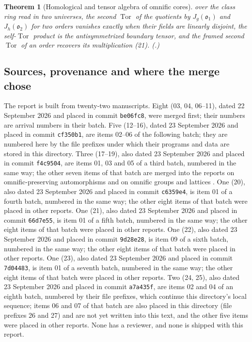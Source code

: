 \documentclass[11pt,letterpaper]{article}
\numberwithin{equation}{section}
\theoremstyle{definition}
\theoremstyle{remark}
\theoremstyle{plain}
\newtheorem{maintheorem}{Theorem}
\newcommand{\Tor}{\operatorname{Tor}}
\begin{document}
\begin{maintheorem}[Homological and tensor algebra of omnific cores]
over the class ring read in two universes, the second $\Tor$ of the quotients by $J_g(\mathfrak o_1)$ and $J_h(\mathfrak o_2)$ for two orders
vanishes exactly when their fields are linearly disjoint, the self-$\Tor$ product is the antisymmetrized boundary tensor, and the
framed second $\Tor$ of an order recovers its multiplication (21).
(.)
\end{maintheorem}

\subsection{Sources, provenance and where the merge chose}\label{osq:sub:sources}

The report is built from twenty-two manuscripts. Eight (03, 04, 06--11), dated 22 September 2026
and placed in commit \texttt{be06fc8}, were merged first; their numbers are arrival numbers in
their batch. Five (12--16), dated 23 September 2026 and placed in commit \texttt{cf350b1}, are items
02--06 of the following batch; they are numbered here by the file prefixes under which their
programs and data are stored in this directory. Three (17--19), also dated 23 September 2026 and placed
in commit \texttt{f4c9504}, are items 01, 03 and 05 of a third batch, numbered in the same way; the other
seven items of that batch are merged into the reports on omnific-preserving automorphisms and on omnific
groups and lattices \cite{RepoOpa,RepoOgl}. One (20), also dated 23 September 2026 and placed in commit
\texttt{c6359e4}, is item 01 of a fourth batch, numbered in the same way; the other eight items of that batch were placed
in other reports. One (21), also dated 23 September 2026 and placed in commit \texttt{66d7e55}, is item 01 of a fifth batch,
numbered in the same way; the other eight items of that batch were placed in other reports. One (22), also dated 23 September 2026 and
placed in commit \texttt{9d28e28}, is item 09 of a sixth batch, numbered in the same way; the other eight items of that batch were placed
in other reports. One (23), also dated 23 September 2026 and placed in commit \texttt{7d04483}, is item 01 of a seventh batch,
numbered in the same way; the other eight items of that batch were placed in other reports. Two (24, 25), also dated 23 September 2026 and
placed in commit \texttt{a7a435f}, are items 02 and 04 of an eighth batch, numbered by their file prefixes, which continue this directory's local
sequence; items 06 and 07 of that batch are also placed in this directory (file prefixes 26 and 27) and are not yet written into this text, and
the other five items were placed in other reports. None has a reviewer, and none is shipped with this report.
\end{document}
